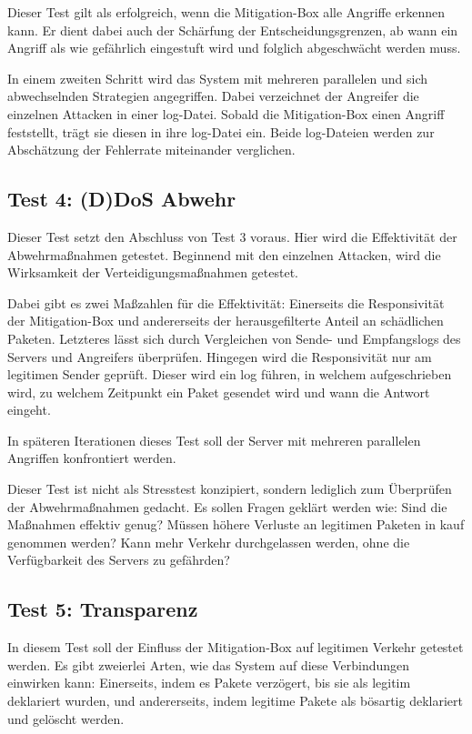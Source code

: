 \documentclass[../review_1.tex]{subfiles}
\begin{document}
Dieser Test gilt als erfolgreich, wenn die Mitigation-Box alle Angriffe erkennen kann. Er dient dabei auch der Schärfung der Entscheidungsgrenzen, ab wann ein Angriff als wie gefährlich eingestuft wird und folglich abgeschwächt werden muss.

In einem zweiten Schritt wird das System mit mehreren parallelen und sich abwechselnden Strategien angegriffen. Dabei verzeichnet der Angreifer die einzelnen Attacken in einer log-Datei. Sobald die Mitigation-Box einen Angriff feststellt, trägt sie diesen in ihre log-Datei ein. Beide log-Dateien werden zur Abschätzung der Fehlerrate miteinander verglichen.

\subsection{Test 4: (D)DoS Abwehr}
Dieser Test setzt den Abschluss von Test 3 voraus. Hier wird die Effektivität der Abwehrmaßnahmen getestet. Beginnend mit den einzelnen Attacken, wird die Wirksamkeit der Verteidigungsmaßnahmen getestet. 

Dabei gibt es zwei Maßzahlen für die Effektivität: Einerseits die Responsivität der Mitigation-Box und andererseits der herausgefilterte Anteil an schädlichen Paketen. Letzteres lässt sich durch Vergleichen von Sende- und Empfangslogs des Servers und Angreifers überprüfen. Hingegen wird die Responsivität nur am legitimen Sender geprüft. Dieser wird ein log führen, in welchem aufgeschrieben wird, zu welchem Zeitpunkt ein Paket gesendet wird und wann die Antwort eingeht. 

In späteren Iterationen dieses Test soll der Server mit mehreren parallelen Angriffen konfrontiert werden.

Dieser Test ist nicht als Stresstest konzipiert, sondern lediglich zum Überprüfen der Abwehrmaßnahmen gedacht. Es sollen Fragen geklärt werden wie: Sind die Maßnahmen effektiv genug? Müssen höhere Verluste an legitimen Paketen in kauf genommen werden? Kann mehr Verkehr durchgelassen werden, ohne die Verfügbarkeit des Servers zu gefährden?

\subsection{Test 5: Transparenz}
In diesem Test soll der Einfluss der Mitigation-Box auf legitimen Verkehr getestet werden. Es gibt zweierlei Arten, wie das System auf diese Verbindungen einwirken kann: Einerseits, indem es Pakete verzögert, bis sie als legitim deklariert wurden, und andererseits, indem legitime Pakete als bösartig deklariert und gelöscht werden.
\end{document}
